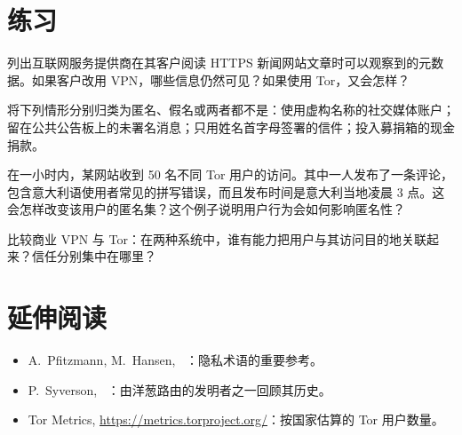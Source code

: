 \section*{练习}

\begin{esercizio}[1]\label{es:01-metadati}
列出互联网服务提供商在其客户阅读 HTTPS 新闻网站文章时可以观察到的元数据。如果客户改用 VPN，哪些信息仍然可见？如果使用 Tor，又会怎样？
\end{esercizio}

\begin{esercizio}[1]\label{es:01-termini}
将下列情形分别归类为匿名、假名或两者都不是：使用虚构名称的社交媒体账户；留在公共公告板上的未署名消息；只用姓名首字母签署的信件；投入募捐箱的现金捐款。
\end{esercizio}

\begin{esercizio}[2]\label{es:01-insieme}
在一小时内，某网站收到 50 名不同 Tor 用户的访问。其中一人发布了一条评论，包含意大利语使用者常见的拼写错误，而且发布时间是意大利当地凌晨 3 点。这会怎样改变该用户的匿名集？这个例子说明用户行为会如何影响匿名性？
\end{esercizio}

\begin{esercizio}[2]\label{es:01-vpn}
比较商业 VPN 与 Tor：在两种系统中，谁有能力把用户与其访问目的地关联起来？信任分别集中在哪里？
\end{esercizio}

\section*{延伸阅读}
\begin{itemize}
  \item A.~Pfitzmann, M.~Hansen, ~\cite{pfitzmann2010terminology}：隐私术语的重要参考。
  \item P.~Syverson, ~\cite{syverson2011peel}：由洋葱路由的发明者之一回顾其历史。
  \item Tor Metrics, \url{https://metrics.torproject.org/}：按国家估算的 Tor 用户数量。
\end{itemize}
